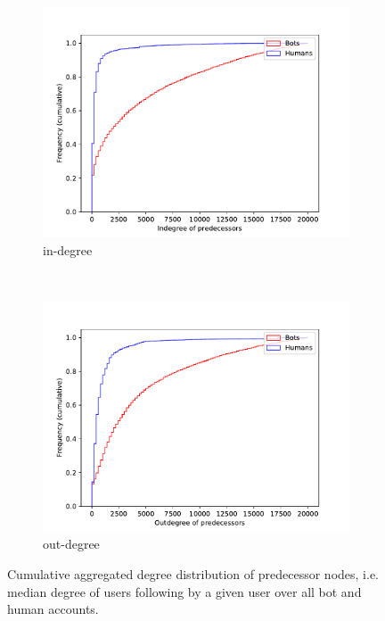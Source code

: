 \begin{figure}[t!]
    \centering
    \begin{subfigure}[t]{0.5\textwidth}
        \centering
        \includegraphics[width=\textwidth]{paper/FIG/indegree_pre.pdf}
        \caption{in-degree}
    \end{subfigure}%
    ~ 
    \begin{subfigure}[t]{0.5\textwidth}
        \centering
        \includegraphics[width=\textwidth]{paper/FIG/outdegree_pre.pdf}
        \caption{out-degree}
    \end{subfigure}
    \caption{Cumulative aggregated degree distribution of predecessor nodes, i.e. median degree of users following by a given user over all bot and human accounts.}
    \label{fig:cum_degrees_predecessors}
\end{figure}

